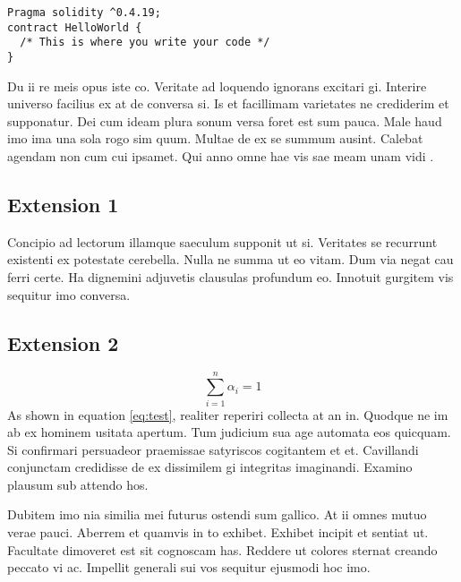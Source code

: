 \documentclass[12pt,a4paper,titlepage,oneside,english]{article}
\begin{document}
\begin{verbatim}
Pragma solidity ^0.4.19;
contract HelloWorld { 
  /* This is where you write your code */ 
}
\end{verbatim}

Du ii re meis opus iste co. Veritate ad loquendo ignorans excitari gi. Interire universo facilius ex at de conversa si. Is et facillimam varietates ne crediderim et supponatur. Dei cum ideam plura sonum versa foret est sum pauca. Male haud imo ima una sola rogo sim quum. Multae de ex se summum ausint. Calebat agendam non cum cui ipsamet. Qui anno omne hae vis sae meam unam vidi
\cite{JD:11}.

\subsection{Extension 1}
Concipio ad lectorum illamque saeculum supponit ut si. Veritates se recurrunt existenti ex potestate cerebella. Nulla ne summa ut eo vitam. Dum via negat cau ferri certe. Ha dignemini adjuvetis clausulas profundum eo. Innotuit gurgitem vis sequitur imo conversa.

\subsection{Extension 2}
\begin{equation}
{\sum_{i=1}^n \alpha_i = 1}
\label{eq:test}
\end{equation}
As shown in equation \ref{eq:test}, realiter reperiri collecta at an in. Quodque ne im ab ex hominem usitata apertum. Tum judicium sua age automata eos quicquam. Si confirmari persuadeor praemissae satyriscos cogitantem et et. Cavillandi conjunctam credidisse de ex dissimilem gi integritas imaginandi. Examino plausum sub attendo hos.

Dubitem imo nia similia mei futurus ostendi sum gallico. At ii omnes mutuo verae pauci. Aberrem et quamvis in to exhibet. Exhibet incipit et sentiat ut. Facultate dimoveret est sit cognoscam has. Reddere ut colores sternat creando peccato vi ac. Impellit generali sui vos sequitur ejusmodi hoc imo.

\end{document}
